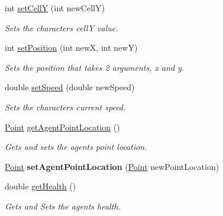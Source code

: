 \begin{DoxyCompactItemize}
\mbox{\label{class_agent_aa5e72b9928f0c0cfc7dd93240dbf6bfc}} 
int \hyperlink{class_agent_aa5e72b9928f0c0cfc7dd93240dbf6bfc}{set\+CellY} (int new\+CellY)
\begin{DoxyCompactList}\small\item\em Sets the characters cellY value. \end{DoxyCompactList}\item 
\mbox{\label{class_agent_ad0b44c550842be01f5cf530eaaa1d21f}} 
int \hyperlink{class_agent_ad0b44c550842be01f5cf530eaaa1d21f}{set\+Position} (int newX, int newY)
\begin{DoxyCompactList}\small\item\em Sets the position that takes 2 arguments, x and y. \end{DoxyCompactList}\item 
\mbox{\label{class_agent_a75e2e56c3a0a8bdee42ddc5750a06684}} 
double \hyperlink{class_agent_a75e2e56c3a0a8bdee42ddc5750a06684}{set\+Speed} (double new\+Speed)
\begin{DoxyCompactList}\small\item\em Sets the characters current speed. \end{DoxyCompactList}\item 
\mbox{\label{class_agent_a78215921c404b25326daa1ba3bf6d15d}} 
\hyperlink{class_point}{Point} \hyperlink{class_agent_a78215921c404b25326daa1ba3bf6d15d}{get\+Agent\+Point\+Location} ()
\begin{DoxyCompactList}\small\item\em Gets and sets the agents point location. \end{DoxyCompactList}\item 
\mbox{\label{class_agent_a384d639479f5c149275780f4e39c64c7}} 
\hyperlink{class_point}{Point} {\bfseries set\+Agent\+Point\+Location} (\hyperlink{class_point}{Point} new\+Point\+Location)
\item 
\mbox{\label{class_agent_af30ae01f87dcf622ceb50921ecaa3075}} 
double \hyperlink{class_agent_af30ae01f87dcf622ceb50921ecaa3075}{get\+Health} ()
\begin{DoxyCompactList}\small\item\em Gets and Sets the agents health. \end{DoxyCompactList}\item 

\end{DoxyCompactItemize}
